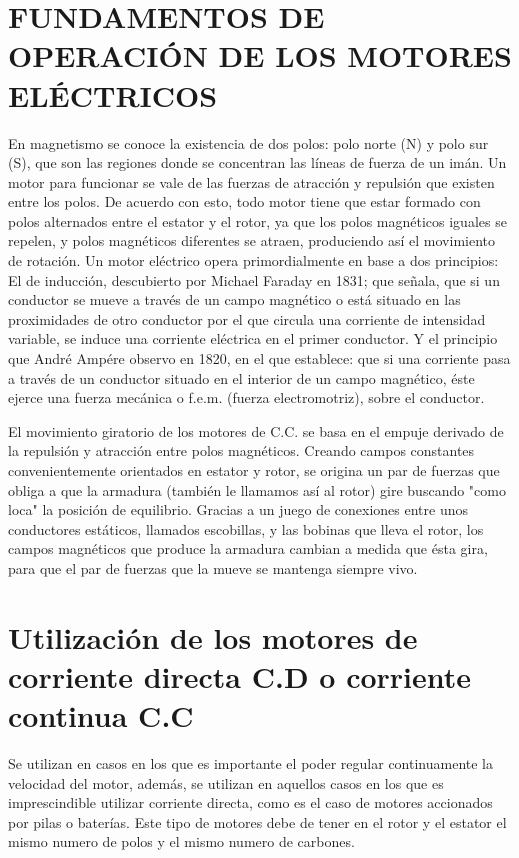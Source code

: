 \documentclass[10pt,letterpaper]{article}
\begin{document}
\section{FUNDAMENTOS DE OPERACIÓN DE LOS MOTORES ELÉCTRICOS}
En magnetismo se conoce la existencia de dos polos: polo norte (N) y polo sur (S), que son las regiones donde se concentran las líneas de fuerza de un imán. Un motor para funcionar se vale de las fuerzas de atracción y repulsión que existen entre los polos. De acuerdo con esto, todo motor tiene que estar formado con polos alternados entre el estator y el rotor, ya que los polos magnéticos iguales se repelen, y polos magnéticos diferentes se atraen, produciendo así el movimiento de rotación.
Un motor eléctrico opera primordialmente en base a dos principios: El de inducción, descubierto por Michael Faraday en 1831; que señala, que si un conductor se mueve a través de un campo magnético o está situado en las proximidades de otro conductor por el que circula una corriente de intensidad variable, se induce una corriente eléctrica en el primer conductor. Y el principio que André Ampére observo en 1820, en el que establece: que si una corriente pasa a través de un conductor situado en el interior de un campo magnético, éste ejerce una fuerza mecánica o f.e.m. (fuerza electromotriz), sobre el conductor.

El movimiento giratorio de los motores de C.C. se basa en el empuje derivado de la repulsión y atracción entre polos magnéticos. Creando campos constantes convenientemente orientados en estator y rotor, se origina un par de fuerzas que obliga a que la armadura (también le llamamos así al rotor) gire buscando "como loca" la posición de equilibrio.
Gracias a un juego de conexiones entre unos conductores estáticos, llamados escobillas, y las bobinas que lleva el rotor, los campos magnéticos que produce la armadura cambian a medida que ésta gira, para que el par de fuerzas que la mueve se mantenga siempre vivo.


\section{Utilización de los motores de corriente directa C.D o corriente continua C.C}
Se utilizan en casos en los que es importante el poder regular continuamente la velocidad del motor, además, se utilizan en aquellos casos en los que es imprescindible utilizar corriente directa, como es el caso de motores accionados por pilas o baterías. Este tipo de motores debe de tener en el rotor y el estator el mismo numero de polos y el mismo numero de carbones.
\end{document}
